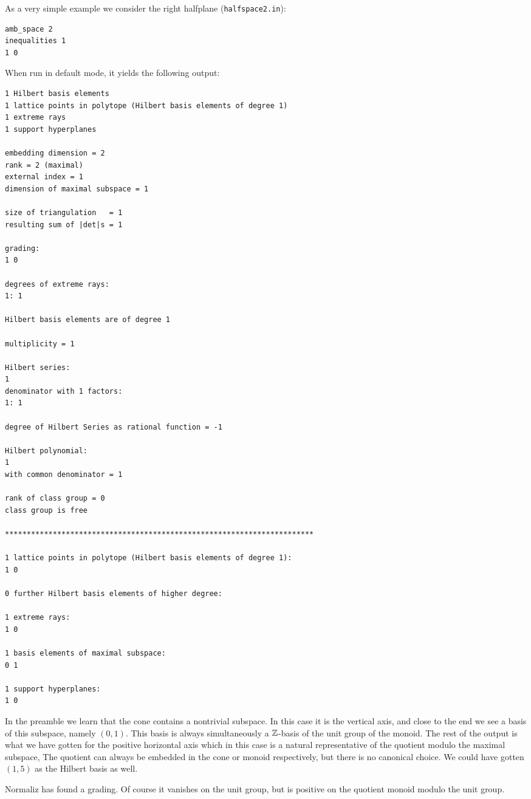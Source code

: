 As a very simple example we consider the right halfplane (\verb|halfspace2.in|):
\begin{Verbatim}
amb_space 2
inequalities 1 
1 0
\end{Verbatim}
When run in default mode, it yields the following output:
\begin{Verbatim}
1 Hilbert basis elements
1 lattice points in polytope (Hilbert basis elements of degree 1)
1 extreme rays
1 support hyperplanes

embedding dimension = 2
rank = 2 (maximal)
external index = 1
dimension of maximal subspace = 1

size of triangulation   = 1
resulting sum of |det|s = 1

grading:
1 0 

degrees of extreme rays:
1: 1  

Hilbert basis elements are of degree 1

multiplicity = 1

Hilbert series:
1 
denominator with 1 factors:
1: 1  

degree of Hilbert Series as rational function = -1

Hilbert polynomial:
1 
with common denominator = 1

rank of class group = 0
class group is free

***********************************************************************

1 lattice points in polytope (Hilbert basis elements of degree 1):
1 0

0 further Hilbert basis elements of higher degree:

1 extreme rays:
1 0

1 basis elements of maximal subspace:
0 1

1 support hyperplanes:
1 0
\end{Verbatim}

In the preamble we learn that the cone contains a nontrivial subspace. In this case it is the vertical axis, and close to the end we see a basis of this subspace, namely $(0,1)$. This basis is always simultaneously a ${\mathbb Z}$-basis of the unit group of the monoid. The rest of the output is what we have gotten for the positive horizontal axis which in this case is a natural representative of the quotient modulo the maximal subspace, The quotient can always be embedded in the cone or monoid respectively, but there is no canonical choice. We could have gotten $(1,5)$ as the Hilbert basis as well.

Normaliz has found a grading. Of course it vanishes on the unit group, but is positive on the quotient monoid modulo the unit group.

